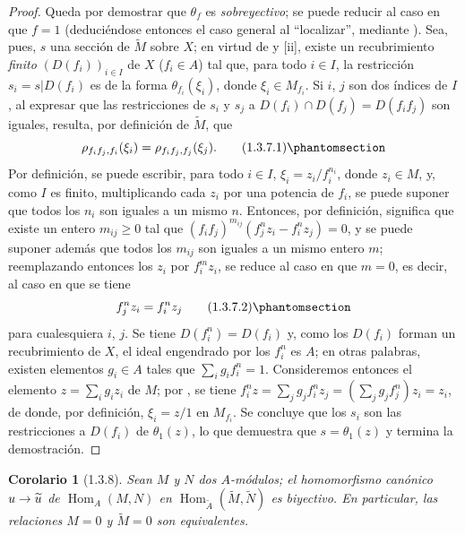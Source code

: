 \documentclass[oneside]{amsart}
\theoremstyle{ega-env-style}
\theoremstyle{ega-thm-env-style}
\newtheorem*{corollary}{Corolario}
\theoremstyle{ega-defn-env-style}
\def\geq{\geqslant}                 %
\renewcommand{\to}{\mathchoice{\longrightarrow}{\rightarrow}{\rightarrow}{\rightarrow}}
\newcommand{\oldpage}[2][]{{\marginnote{\normalfont{\textbf{#1}~|~#2}}}\ignorespaces}
\let\EGAOriginalLabel\label
\renewcommand{\label}[1]{\phantomsection\EGAOriginalLabel{#1}}
\begin{document}
\begin{proof}
Queda por demostrar que $\theta_f$ es \emph{sobreyectivo};
se puede reducir al caso en que $f=1$ (deduciéndose entonces el caso general al ``localizar'', mediante ).
Sea, pues, $s$ una sección de $\widetilde{M}$ sobre $X$;
en virtud de  y [ii], existe un recubrimiento \emph{finito} $(D(f_i))_{i\in I}$ de $X$ ($f_i\in A$) tal que, para todo $i\in I$, la restricción $s_i=s|D(f_i)$ es de la forma $\theta_{f_i}(\xi_i)$, donde $\xi_i\in M_{f_i}$.
Si $i$, $j$ son dos índices de $I$, al expresar que las restricciones de $s_i$ y $s_j$ a $D(f_i)\cap D(f_j)=D(f_i f_j)$ son iguales, resulta, por definición de $\widetilde{M}$, que
\begin{equation}
  \rho_{f_i f_j,f_i}(\xi_i)=\rho_{f_i f_j,f_j}(\xi_j).
  \tag{1.3.7.1}\label{I.1.3.7.1-fr}
\end{equation}
Por definición, se puede escribir, para todo $i\in I$, $\xi_i=z_i/f_i^{n_i}$, donde $z_i\in M$, y, como $I$ es finito, multiplicando cada $z_i$ por una potencia de $f_i$, se puede suponer que todos los $n_i$ son iguales a un mismo $n$.
Entonces, por definición,  significa que existe un entero $m_{ij}\geq0$ tal que $(f_i f_j)^{m_{ij}}(f_j^n z_i-f_i^n z_j)=0$, y se puede suponer además que todos los $m_{ij}$ son iguales a un mismo entero $m$;
reemplazando entonces los $z_i$ por $f_i^m z_i$, se reduce al caso en que $m=0$, es decir, al caso en que se tiene
\begin{equation}
  f_j^n z_i=f_i^n z_j
  \tag{1.3.7.2}\label{I.1.3.7.2-fr}
\end{equation}
para cualesquiera $i$, $j$.
Se tiene $D(f_i^n)=D(f_i)$ y, como los $D(f_i)$ forman un recubrimiento de $X$, el ideal engendrado por los $f_i^n$ es $A$;
en otras palabras, existen elementos $g_i\in A$ tales que $\sum_i g_i f_i^n=1$.
Consideremos entonces el elemento $z=\sum_i g_i z_i$ de $M$;
por , se tiene $f_i^n z=\sum_j g_j f_i^n z_j=(\sum_j g_j f_j^n)z_i=z_i$, de donde, por definición, $\xi_i=z/1$ en $M_{f_i}$.
Se concluye
\oldpage[I]{87}
que los $s_i$ son las restricciones a $D(f_i)$ de $\theta_1(z)$, lo que demuestra que $s=\theta_1(z)$ y termina la demostración.
\end{proof}

\begin{corollary}[1.3.8]
\label{I.1.3.8}
Sean $M$ y $N$ dos $A$-módulos;
el homomorfismo canónico $u\to\widetilde{u}$ de $\operatorname{Hom}_A(M,N)$ en $\operatorname{Hom}_{\widetilde{A}}(\widetilde{M},\widetilde{N})$ es biyectivo.
En particular, las relaciones $M=0$ y $\widetilde{M}=0$ son equivalentes.
\end{corollary}
\end{document}
